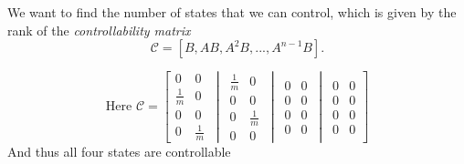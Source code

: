 We want to find the number of states that we can control, which is given by the rank of the \emph{controllability matrix}
\begin{equation}
\mathcal{C} = [ B, AB, A^2B, ... , A^{n-1}B ].
\end{equation}

\begin{equation}
\textrm{Here }
\mathcal{C}=\left[
\begin{matrix} 
0 & 0\\
\frac{1}{m} & 0 \\
0 & 0 \\
0 & \frac{1}{m}
\end{matrix}
\,\middle\vert\,
\begin{matrix} 
\frac{1}{m}& 0\\
0 & 0\\
0 & \frac{1}{m}\\
0 & 0
\end{matrix}
\,\middle\vert\,
\begin{matrix} 
0 & 0\\
0 & 0 \\
0 & 0 \\
0 & 0
\end{matrix}
\,\middle\vert\,
\begin{matrix} 
0 & 0\\
0 & 0\\
0 & 0\\
0 & 0
\end{matrix}
 \right]
\end{equation}
And thus all four states are controllable

